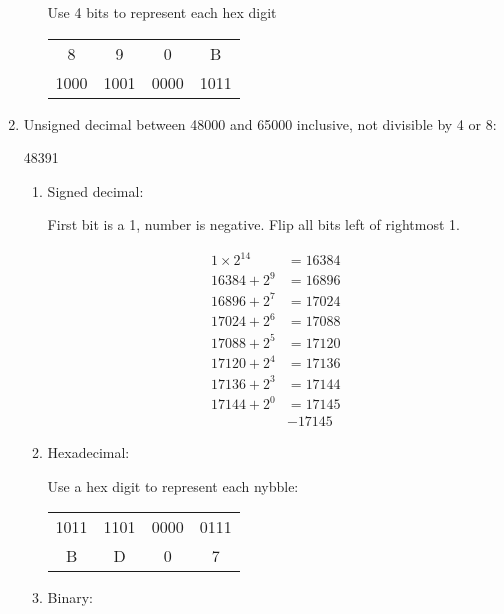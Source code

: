\documentclass[11pt]{article}
\begin{document}
\begin{enumerate}
\begin{enumerate}
Use 4 bits to represent each hex digit


\begin{tabular}{c c c c}
8&9&0&B\\
1000&1001&0000&1011
\end{tabular}

\end{enumerate}

\item Unsigned decimal between 48000 and 65000 inclusive, not divisible by 4 or 8:

48391

\begin{enumerate}
\item Signed decimal:


First bit is a 1, number is negative. Flip all bits left of rightmost 1.




\begin{align*}
	1\times2^{14}&=16384\\
	16384 + 2^9&=16896\\
	16896 + 2^7&=17024\\
	17024 + 2^6&=17088\\
	17088 + 2^5&=17120\\
	17120 + 2^4&=17136\\
	17136 + 2^3&=17144\\
	17144 + 2^0&=17145\\
	&\boxed{-17145}
\end{align*}
\item Hexadecimal:

Use a hex digit to represent each nybble:

\begin{tabular}{c c c c}
1011&1101&0000&0111\\
B&D&0&7
\end{tabular}


\item Binary:


\end{enumerate}
\end{enumerate}
\end{document}
